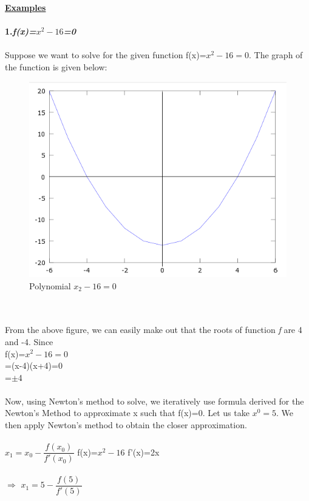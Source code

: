 \documentclass[15pt]{report}
\begin{document}
\newpage
{\textbf{\underline{\Large Examples}}}\\ \\
{\large \textbf{1.\hspace*{5mm}\textit{f(x)=$x^{2}-16$=0}}}\\ \\ 
Suppose we want to solve for the given function f(x)=$x^{2}-16=0$. The graph of the function is given below:\\ 
\begin{figure}[h]
\centering
\includegraphics[width = 0.8 \columnwidth]{3}
\caption{Polynomial $x_{2}-16=0$}
\label{fig:Eg. 1}
\end{figure}\\ \\
From the above figure, we can easily make out that the roots of function \textit{f} are 4 and -4. Since\\
{\large f(x)=$x^{2}-16=0$\\
\hspace*{6mm}=(x-4)(x+4)=0\\
\hspace*{6mm}=$\pm$4}\\ \\
Now, using Newton’s method to solve, we iteratively use formula derived for the Newton's Method to approximate x such that f(x)=0. Let us take $x^{0}=5$. We then apply Newton's method to obtain the closer approximation.\\ \\
{\large $x_{1}=x_{0}-\dfrac{f(x_{0})}{f'(x_{0})}$ \hspace*{20 mm} f(x)=$x^{2}-16$ \hspace*{20mm}  f'(x)=2x}\\ \\
$\Rightarrow$ {\large $x_{1}=5-\dfrac{f(5)}{f'(5)}$} \\ \\
\end{document}
